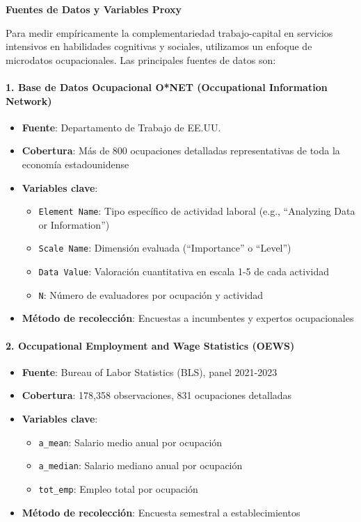 \documentclass{article}
\theoremstyle{remark}
\theoremstyle{definition}
\begin{document}
\begin{tcolorbox}
    
\textbf{Fuentes de Datos y Variables Proxy}

Para medir empíricamente la complementariedad trabajo-capital en servicios intensivos en habilidades cognitivas y sociales, utilizamos un enfoque de microdatos ocupacionales. Las principales fuentes de datos son:

\paragraph{1. Base de Datos Ocupacional O*NET (Occupational Information Network)}
\begin{itemize}
\item \textbf{Fuente}: Departamento de Trabajo de EE.UU.
\item \textbf{Cobertura}: Más de 800 ocupaciones detalladas representativas de toda la economía estadounidense
\item \textbf{Variables clave}:
  \begin{itemize}
  \item \texttt{Element Name}: Tipo específico de actividad laboral (e.g., ``Analyzing Data or Information'')
  \item \texttt{Scale Name}: Dimensión evaluada (``Importance'' o ``Level'')
  \item \texttt{Data Value}: Valoración cuantitativa en escala 1-5 de cada actividad
  \item \texttt{N}: Número de evaluadores por ocupación y actividad
  \end{itemize}
\item \textbf{Método de recolección}: Encuestas a incumbentes y expertos ocupacionales
\end{itemize}

\paragraph{2. Occupational Employment and Wage Statistics (OEWS)}
\begin{itemize}
\item \textbf{Fuente}: Bureau of Labor Statistics (BLS), panel 2021-2023
\item \textbf{Cobertura}: 178,358 observaciones, 831 ocupaciones detalladas
\item \textbf{Variables clave}:
  \begin{itemize}
  \item \texttt{a\_mean}: Salario medio anual por ocupación
  \item \texttt{a\_median}: Salario mediano anual por ocupación
  \item \texttt{tot\_emp}: Empleo total por ocupación
  \end{itemize}
\item \textbf{Método de recolección}: Encuesta semestral a establecimientos
\end{itemize}


\end{tcolorbox}
\end{document}
